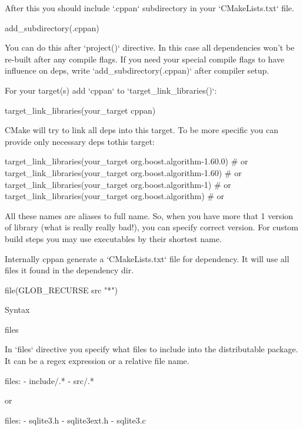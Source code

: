 After this you should include `.cppan` subdirectory in your `CMakeLists.txt` file.

\begin{cmake}
    add_subdirectory(.cppan)
\end{cmake}

You can do this after `project()` directive. In this case all dependencies won't be re-built after any compile flags. If you need your special compile flags to have influence on deps, write `add_subdirectory(.cppan)` after compiler setup.

For your target(s) add `cppan` to `target_link_libraries()`:

\begin{cmake}
    target_link_libraries(your_target cppan)
\end{cmake}

CMake will try to link all deps into this target. To be more specific you can provide only necessary deps tothis target:

\begin{cmake}
    target_link_libraries(your_target org.boost.algorithm-1.60.0) # or
    target_link_libraries(your_target org.boost.algorithm-1.60) # or
    target_link_libraries(your_target org.boost.algorithm-1) # or
    target_link_libraries(your_target org.boost.algorithm) # or
\end{cmake}

All these names are aliases to full name. So, when you have more that 1 version of library (what is really really bad!), you can specify correct version.
For custom build steps you may use executables by their shortest name.

Internally cppan generate a `CMakeLists.txt` file for dependency. It will use all files it found in the dependency dir.

\begin{cmake}
    file(GLOB_RECURSE src "*")
\end{cmake}


Syntax

files

In `files` directive you specify what files to include into the distributable package. It can be a regex expression or a relative file name.

\begin{cppan}
    files:
        - include/.*
        - src/.*
\end{cppan}

or

\begin{cppan}
    files:
        - sqlite3.h
        - sqlite3ext.h
        - sqlite3.c
\end{cppan}

